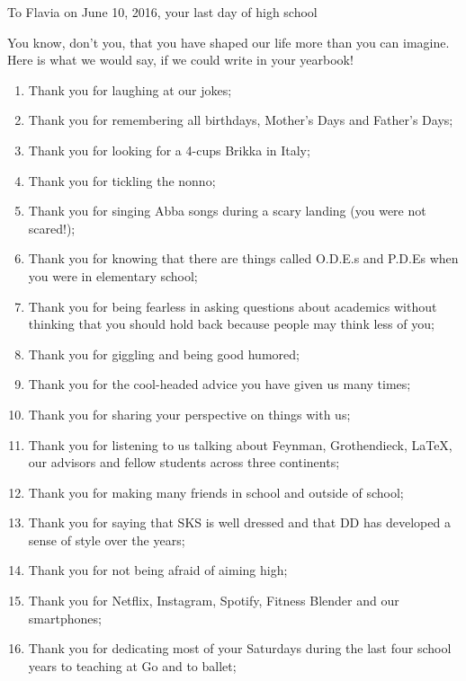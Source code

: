 \documentclass[11pt,dvipsnames]{article}
\newenvironment{myfont}{\fontfamily{frc}\selectfont}{\par}
\begin{document}
\thispagestyle{empty}
\begin{center}
\begin{myfont}
{\Large To Flavia on June 10, 2016, your last day of high school }	
\end{myfont}
\end{center}


You know, don't you, that you have shaped our life more than you can imagine. Here is what we would say, if we could write in your yearbook! 

\begin{enumerate}[label= {$\heartsuit${\arabic*:}}]
\item Thank you for laughing at our jokes;
\item Thank you for remembering all birthdays, Mother's Days and Father's Days;
\item Thank you for looking for a 4-cups Brikka in Italy;
\item Thank you for tickling the nonno;
\item Thank you for singing Abba songs during a scary landing (you were not scared!);
\item Thank you for knowing that there are things called O.D.E.s and P.D.Es when you were in elementary school;
\item Thank you for being fearless in asking questions about academics without thinking that you should hold back because people may think less of you;
\item Thank you for giggling and being good humored;
\item Thank you for the cool-headed advice you have given us many times;
\item Thank you for sharing your perspective on things with us;
\item Thank you for listening to us talking about Feynman, Grothendieck, \LaTeX,   our advisors and fellow students across three continents;
\item Thank you for making many friends in school and outside of school;
\item Thank you for saying that SKS is well dressed and that DD has developed a sense of style over the years;
\item Thank you for not being afraid of aiming high;
\item Thank you for Netflix, Instagram, Spotify, Fitness Blender and our smartphones;
\item Thank you for dedicating most of your Saturdays during the last four school years to teaching at Go and to ballet;

\end{enumerate}
\end{document}
